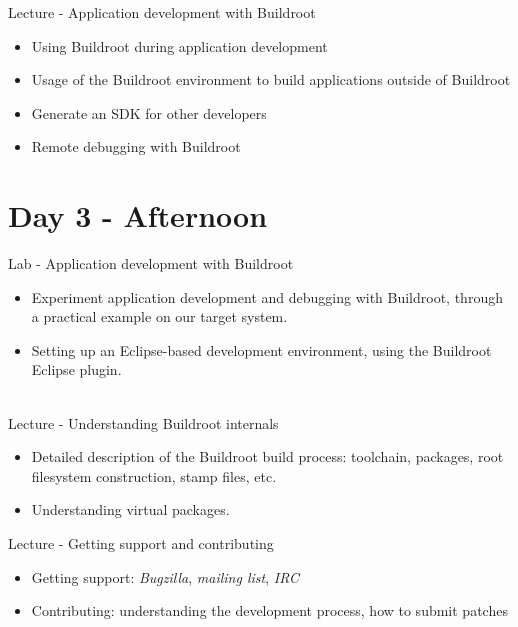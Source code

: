 \documentclass[a4paper,12pt,obeyspaces,spaces,hyphens]{article}
\begin{document}
\feagendaonecolumn
{Lecture - Application development with Buildroot}
{
  \begin{itemize}
  \item Using Buildroot during application development
  \item Usage of the Buildroot environment to build applications
    outside of Buildroot
  \item Generate an SDK for other developers
  \item Remote debugging with Buildroot
  \end{itemize}
}

\section{Day 3 - Afternoon}

\feagendaonecolumn
{Lab - Application development with Buildroot}
{
  \begin{itemize}
  \item Experiment application development and debugging with
    Buildroot, through a practical example on our target system.
  \item Setting up an Eclipse-based development environment, using the
    Buildroot Eclipse plugin.
  \end{itemize}
}
\\
\feagendatwocolumn
{Lecture - Understanding Buildroot internals}
{
  \begin{itemize}
  \item Detailed description of the Buildroot build process:
    toolchain, packages, root filesystem construction, stamp files,
    etc.
  \item Understanding virtual packages.
  \end{itemize}
}
{Lecture - Getting support and contributing}
{
  \begin{itemize}
  \item Getting support: {\em Bugzilla}, {\em mailing list}, {\em IRC}
  \item Contributing: understanding the development process, how to
    submit patches
  \end{itemize}
}
\end{document}
